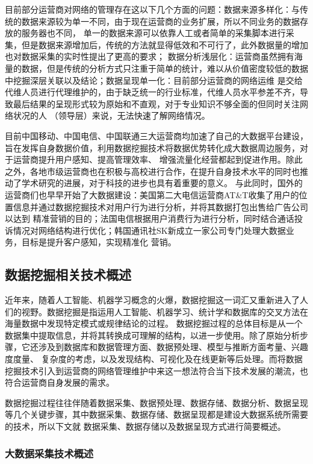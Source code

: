 \documentclass{HustGraduPaper}
\begin{document}
    目前部分运营商对网络的管理存在这以下几个方面的问题：数据来源多样化：与传统的数据来源较为单一不同，由于现在运营商的业务扩展，所以不同业务的数据存放的服务器也不同，
    单一的数据来源可以依靠人工或者简单的采集脚本进行采集，但是数据来源增加后，传统的方法就显得低效和不可行了，此外数据量的增加也对数据采集的实时性提出了更高的要求；
    数据分析浅层化：运营商虽然拥有海量的数据，但是传统的分析方式只注重于简单的统计，难以从价值密度较低的数据中挖掘深层关联以及结论；数据呈现单一化：目前部分运营商的网络运维
    是交给代维人员进行代理维护的，由于缺乏统一的行业标准，代维人员水平参差不齐，导致最后结果的呈现形式较为原始和不直观，对于专业知识不够全面的但同时关注网络状况的人
    （领导层）来说，无法快速了解网络情况。

    目前中国移动、中国电信、中国联通三大运营商均加速了自己的大数据平台建设，旨在发挥自身数据价值，利用数据挖掘技术将数据优势转化成大数据周边服务，对于运营商提升用户感知、提高管理效率、
    增强流量化经营都起到促进作用。除此之外，各地市级运营商也在积极与高校进行合作，在提升自身技术水平的同时也推动了学术研究的进展，对于科技的进步也具有着重要的意义。
    与此同时，国外的运营商们也早早开始了大数据建设：美国第二大电信运营商AT\&T收集了用户的位置信息并通过数据挖掘技术对用户行为进行分析，并将其数据打包出售给广告公司以达到
    精准营销的目的；法国电信根据用户消费行为进行分析，同时结合通话投诉情况对网络结构进行优化；韩国通讯社SK新成立一家公司专门处理大数据业务，目标是提升客户感知，实现精准化
    营销。

    \subsection{数据挖掘相关技术概述}
    近年来，随着人工智能、机器学习概念的火爆，数据挖掘这一词汇又重新进入了人们的视野。数据挖掘是指运用人工智能、机器学习、统计学和数据库的交叉方法在海量数据中发现特定模式或规律结论的过程。
    数据挖掘过程的总体目标是从一个数据集中提取信息，并将其转换成可理解的结构，以进一步使用。除了原始分析步骤，它还涉及到数据库和数据管理方面、数据预处理、模型与推断方面考量、兴趣度度量、
    复杂度的考虑，以及发现结构、可视化及在线更新等后处理。而将数据挖掘技术引入到运营商的网络管理维护中来这一想法符合当下技术发展的潮流，也符合运营商自身发展的需求。
    
    数据挖掘过程往往伴随着数据采集、数据预处理、数据存储、数据分析、数据呈现等几个关键步骤，其中数据采集、数据存储、数据呈现都是建设大数据系统所需要的技术，所以下文就
    数据采集、数据存储以及数据呈现方式进行简要概述。
    \subsubsection{大数据采集技术概述}
    
\end{document}
